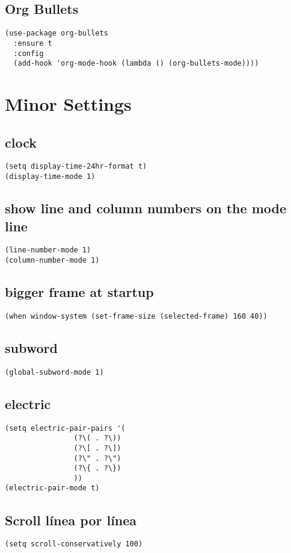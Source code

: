 \documentclass[11pt]{article}
\begin{document}
\subsection{Org Bullets}
\label{sec-3-2}
\begin{verbatim}
(use-package org-bullets
  :ensure t
  :config
  (add-hook 'org-mode-hook (lambda () (org-bullets-mode))))
\end{verbatim}

\section{Minor Settings}
\label{sec-4}
\subsection{clock}
\label{sec-4-1}
\begin{verbatim}
(setq display-time-24hr-format t)
(display-time-mode 1)
\end{verbatim}
\subsection{show line and column numbers on the mode line}
\label{sec-4-2}
\begin{verbatim}
(line-number-mode 1)
(column-number-mode 1)
\end{verbatim}
\subsection{bigger frame at startup}
\label{sec-4-3}
\begin{verbatim}
(when window-system (set-frame-size (selected-frame) 160 40))
\end{verbatim}
\subsection{subword}
\label{sec-4-4}
\begin{verbatim}
(global-subword-mode 1)
\end{verbatim}
\subsection{electric}
\label{sec-4-5}
\begin{verbatim}
(setq electric-pair-pairs '(
			    (?\( . ?\))
			    (?\[ . ?\])
			    (?\" . ?\")
			    (?\{ . ?\})
			    ))
(electric-pair-mode t)
\end{verbatim}
\subsection{Scroll línea por línea}
\label{sec-4-6}
\begin{verbatim}
(setq scroll-conservatively 100)
\end{verbatim}
\end{document}
